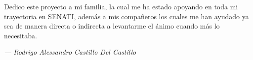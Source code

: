 Dedico este proyecto a mi familia, la cual me ha estado apoyando en toda mi trayectoria en SENATI, además a mis compañeros los cuales me han ayudado ya sea de manera directa o indirecta a levantarme el ánimo cuando más lo necesitaba.

\begin{flushright}
    \small\textit{--- Rodrigo Alessandro Castillo Del Castillo}
\end{flushright}